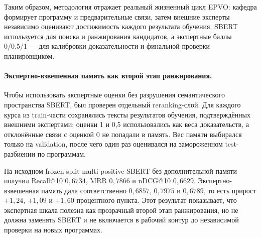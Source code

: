 \documentclass[twoside,11pt]{article}
\begin{document}
Таким образом, методология отражает реальный жизненный цикл EPVO: кафедра формирует программу и предварительные связи, затем внешние эксперты независимо оценивают достижимость каждого результата обучения. SBERT используется для поиска и ранжирования кандидатов, а экспертные баллы 0/0.5/1 --- для калибровки доказательности и финальной проверки планировщиком.

\paragraph{Экспертно-взвешенная память как второй этап ранжирования.}
Чтобы использовать экспертные оценки без разрушения семантического пространства SBERT, был проверен отдельный reranking-слой. Для каждого курса из train-части сохранялись тексты результатов обучения, подтверждённых внешними экспертами; оценки 1 и 0,5 использовались как веса доказательств, а отклонённые связи с оценкой 0 не попадали в память. Вес памяти выбирался только на validation, после чего один раз оценивался на замороженном test-разбиении по программам.

На исходном frozen split multi-positive SBERT без дополнительной памяти получил Recall@10 $0,6734$, MRR $0,7866$ и nDCG@10 $0,6629$. Экспертно-взвешенная память дала соответственно $0,6857$, $0,7975$ и $0,6789$, то есть прирост $+1,24$, $+1,09$ и $+1,60$ процентного пункта. Этот результат показывает, что экспертная шкала полезна как прозрачный второй этап ранжирования, но не должна заменять SBERT и не включается в рабочий контур до независимой проверки на новых программах.
\end{document}
